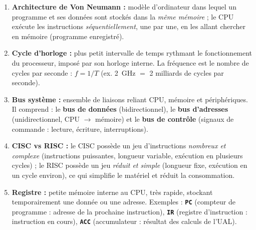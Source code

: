 \documentclass[11pt]{article}
\newcommand{\cle}[1]{{\popxbold\color{popdark}#1}}
\begin{document}
\begin{corrige}
\begin{enumerate}
    \item \textbf{Architecture de Von Neumann :} modèle d'ordinateur dans lequel un \cle{programme et ses données} sont stockés dans la \emph{même mémoire} ; le CPU exécute les instructions \emph{séquentiellement}, une par une, en les allant chercher en mémoire (programme enregistré).
    \item \textbf{Cycle d'horloge :} plus petit intervalle de temps rythmant le fonctionnement du processeur, imposé par son horloge interne. La \cle{fréquence} est le nombre de cycles par seconde : $f = 1/T$ (ex. \SI{2}{GHz} $=$ 2 milliards de cycles par seconde).
    \item \textbf{Bus système :} ensemble de liaisons reliant CPU, mémoire et périphériques. Il comprend : le \textbf{bus de données} (bidirectionnel), le \textbf{bus d'adresses} (unidirectionnel, CPU $\to$ mémoire) et le \textbf{bus de contrôle} (signaux de commande : lecture, écriture, interruptions).
    \item \textbf{CISC vs RISC :} le CISC possède un jeu d'instructions \emph{nombreux et complexe} (instructions puissantes, longueur variable, exécution en plusieurs cycles) ; le RISC possède un jeu \emph{réduit et simple} (longueur fixe, exécution en un cycle environ), ce qui simplifie le matériel et réduit la consommation.
    \item \textbf{Registre :} petite mémoire interne au CPU, très rapide, stockant temporairement une donnée ou une adresse. Exemples : \textbf{\texttt{PC}} (compteur de programme : adresse de la prochaine instruction), \textbf{\texttt{IR}} (registre d'instruction : instruction en cours), \textbf{\texttt{ACC}} (accumulateur : résultat des calculs de l'UAL).
\end{enumerate}
\end{corrige}
\end{document}
